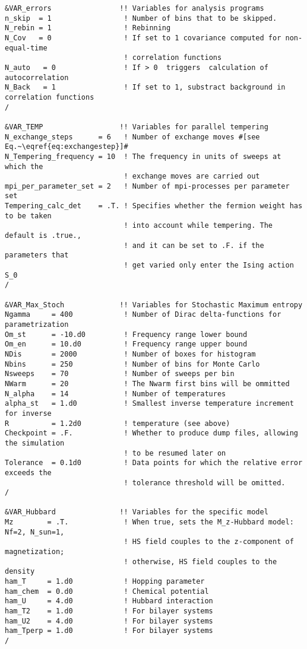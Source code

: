 \begin{lstlisting}[style=fortran,escapechar=\#,breaklines=true]
&VAR_errors                !! Variables for analysis programs
n_skip  = 1                 ! Number of bins that to be skipped.
N_rebin = 1                 ! Rebinning  
N_Cov   = 0                 ! If set to 1 covariance computed for non-equal-time
                            ! correlation functions
N_auto   = 0                ! If > 0  triggers  calculation of autocorrelation 
N_Back   = 1                ! If set to 1, substract background in correlation functions
/  

&VAR_TEMP                  !! Variables for parallel tempering
N_exchange_steps      = 6   ! Number of exchange moves #[see Eq.~\eqref{eq:exchangestep}]#
N_Tempering_frequency = 10  ! The frequency in units of sweeps at which the
                            ! exchange moves are carried out
mpi_per_parameter_set = 2   ! Number of mpi-processes per parameter set
Tempering_calc_det    = .T. ! Specifies whether the fermion weight has to be taken
                            ! into account while tempering. The default is .true.,
                            ! and it can be set to .F. if the parameters that
                            ! get varied only enter the Ising action S_0
/

&VAR_Max_Stoch             !! Variables for Stochastic Maximum entropy
Ngamma     = 400            ! Number of Dirac delta-functions for parametrization
Om_st      = -10.d0         ! Frequency range lower bound
Om_en      = 10.d0          ! Frequency range upper bound
NDis       = 2000           ! Number of boxes for histogram
Nbins      = 250            ! Number of bins for Monte Carlo
Nsweeps    = 70             ! Number of sweeps per bin
NWarm      = 20             ! The Nwarm first bins will be ommitted
N_alpha    = 14             ! Number of temperatures
alpha_st   = 1.d0           ! Smallest inverse temperature increment for inverse
R          = 1.2d0          ! temperature (see above) 
Checkpoint = .F.            ! Whether to produce dump files, allowing the simulation
                            ! to be resumed later on
Tolerance  = 0.1d0          ! Data points for which the relative error exceeds the
                            ! tolerance threshold will be omitted.
/

&VAR_Hubbard               !! Variables for the specific model
Mz        = .T.             ! When true, sets the M_z-Hubbard model: Nf=2, N_sun=1,
                            ! HS field couples to the z-component of magnetization;
                            ! otherwise, HS field couples to the density
ham_T     = 1.d0            ! Hopping parameter
ham_chem  = 0.d0            ! Chemical potential
ham_U     = 4.d0            ! Hubbard interaction
ham_T2    = 1.d0            ! For bilayer systems
ham_U2    = 4.d0            ! For bilayer systems
ham_Tperp = 1.d0            ! For bilayer systems
/
               
\end{lstlisting}
